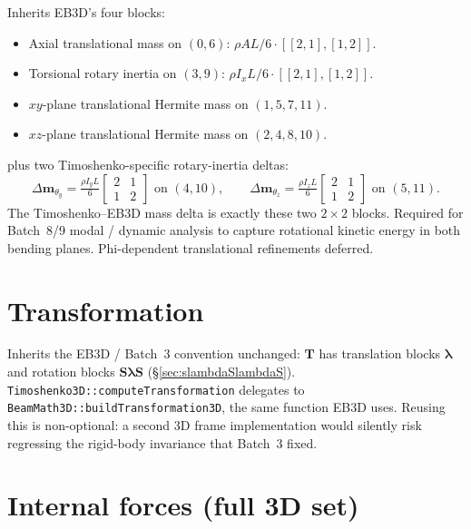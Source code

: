 \documentclass[11pt,a4paper]{book}
\newcommand{\bmath}[1]{\boldsymbol{#1}}
\newcommand{\Sdiag}{\bmath{S}}
\newcommand{\lam}{\bmath{\lambda}}
\begin{document}
Inherits EB3D's four blocks:
\begin{itemize}
    \item Axial translational mass on $(0, 6)$: $\rho A L / 6 \cdot [[2,1],[1,2]]$.
    \item Torsional rotary inertia on $(3, 9)$: $\rho I_x L / 6 \cdot [[2,1],[1,2]]$.
    \item $xy$-plane translational Hermite mass on $(1, 5, 7, 11)$.
    \item $xz$-plane translational Hermite mass on $(2, 4, 8, 10)$.
\end{itemize}
plus two Timoshenko-specific rotary-inertia deltas:
\[
\Delta\bmath{m}_{\theta_y} = \tfrac{\rho I_y L}{6}\begin{bmatrix}2&1\\1&2\end{bmatrix} \text{ on } (4, 10),
\qquad
\Delta\bmath{m}_{\theta_z} = \tfrac{\rho I_z L}{6}\begin{bmatrix}2&1\\1&2\end{bmatrix} \text{ on } (5, 11).
\]
The Timoshenko--EB3D mass delta is exactly these two $2\times 2$ blocks. Required for Batch~8/9 modal / dynamic analysis to capture rotational kinetic energy in both bending planes. Phi-dependent translational refinements deferred.

\section{Transformation}

Inherits the EB3D / Batch~3 convention unchanged: $\bmath{T}$ has translation blocks $\lam$ and rotation blocks $\Sdiag\lam\Sdiag$ (\S\ref{sec:slambdaSlambdaS}). \texttt{Timoshenko3D::computeTransformation} delegates to \texttt{BeamMath3D::buildTransformation3D}, the same function EB3D uses. Reusing this is non-optional: a second 3D frame implementation would silently risk regressing the rigid-body invariance that Batch~3 fixed.

\section{Internal forces (full 3D set)}
\end{document}
